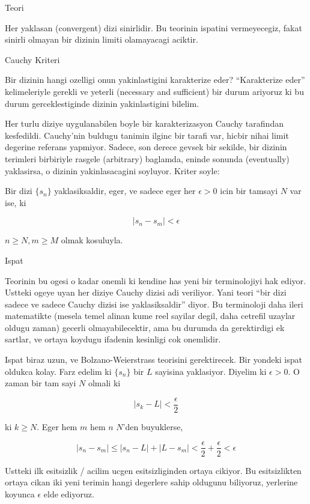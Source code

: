 \documentclass[12pt,fleqn]{article}
\begin{document}
Teori 

Her yaklasan (convergent) dizi sinirlidir. Bu teorinin ispatini
vermeyecegiz, fakat sinirli olmayan bir dizinin limiti olamayacagi
aciktir. 

Cauchy Kriteri 

Bir dizinin hangi ozelligi onun yakinlastigini karakterize eder?
``Karakterize eder'' kelimeleriyle gerekli ve yeterli (necessary and
sufficient) bir durum ariyoruz ki bu durum gerceklestiginde dizinin
yakinlastigini bilelim. 

Her turlu diziye uygulanabilen boyle bir karakterizasyon Cauchy tarafindan
kesfedildi. Cauchy'nin buldugu tanimin ilginc bir tarafi var, hicbir nihai
limit degerine referans yapmiyor. Sadece, son derece gevsek bir sekilde,
bir dizinin terimleri birbiriyle rasgele (arbitrary) baglamda, eninde
sonunda (eventually) yaklasirsa, o dizinin yakinlasacagini soyluyor. Kriter
soyle:

Bir dizi $\{s_n\}$ yaklasiksaldir, eger, ve sadece eger her $\epsilon > 0$
icin bir tamsayi $N$ var ise, ki 

\[ |s_n - s_m| < \epsilon \]

$n \ge N, m \ge M$ olmak kosuluyla. 

Ispat

Teorinin bu ogesi o kadar onemli ki kendine has yeni bir terminolojiyi hak
ediyor. Ustteki ogeye uyan her diziye Cauchy dizisi adi veriliyor. Yani
teori ``bir dizi sadece ve sadece Cauchy dizisi ise yaklasiksaldir''
diyor. Bu terminoloji daha ileri matematikte (mesela temel alinan kume reel
sayilar degil, daha cetrefil uzaylar oldugu zaman) gecerli
olmayabilecektir, ama bu durumda da gerektirdigi ek sartlar, ve ortaya
koydugu ifadenin kesinligi cok onemlidir.

Ispat biraz uzun, ve Bolzano-Weierstrass teorisini gerektirecek. Bir
yondeki ispat oldukca kolay. Farz edelim ki $\{s_n\}$ bir $L$ sayisina
yaklasiyor. Diyelim ki $\epsilon > 0$. O zaman bir tam sayi $N$ olmali ki 

\[ |s_k - L| < \frac{\epsilon}{2} \]

ki $k \ge N$. Eger hem $m$ hem $n$ $N$'den buyuklerse, 

\[ |s_n - s_m| \le |s_n - L| + |L - s_m| < 
\frac{\epsilon}{2} + \frac{\epsilon}{2} <
\epsilon
\]

Ustteki ilk esitsizlik / acilim ucgen esitsizliginden ortaya cikiyor. Bu
esitsizlikten ortaya cikan iki yeni terimin hangi degerlere sahip oldugunu
biliyoruz, yerlerine koyunca $\epsilon$ elde ediyoruz. 
\end{document}
